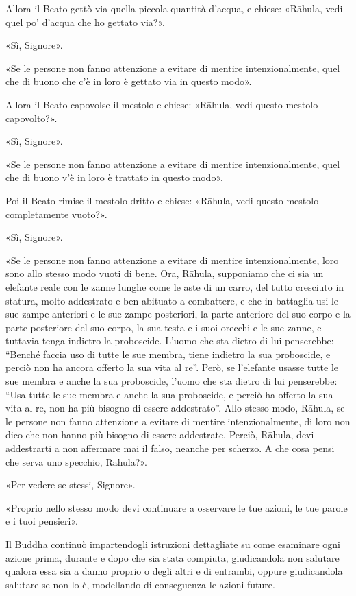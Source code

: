 Allora il Beato gettò via quella piccola quantità d’acqua, e chiese: «Rāhula,
vedi quel po’ d’acqua che ho gettato via?».

«Sì, Signore».

«Se le persone non fanno attenzione a evitare di mentire intenzionalmente, quel
che di buono che c’è in loro è gettato via in questo modo».

Allora il Beato capovolse il mestolo e chiese: «Rāhula, vedi questo mestolo
capovolto?».

«Sì, Signore».

«Se le persone non fanno attenzione a evitare di mentire intenzionalmente, quel
che di buono v’è in loro è trattato in questo modo».

Poi il Beato rimise il mestolo dritto e chiese: «Rāhula, vedi questo mestolo
completamente vuoto?».

«Sì, Signore».

«Se le persone non fanno attenzione a evitare di mentire intenzionalmente, loro
sono allo stesso modo vuoti di bene. Ora, Rāhula, supponiamo che ci sia un
elefante reale con le zanne lunghe come le aste di un carro, del tutto cresciuto
in statura, molto addestrato e ben abituato a combattere, e che in battaglia usi
le sue zampe anteriori e le sue zampe posteriori, la parte anteriore del suo
corpo e la parte posteriore del suo corpo, la sua testa e i suoi orecchi e le
sue zanne, e tuttavia tenga indietro la proboscide. L’uomo che sta dietro di lui
penserebbe: “Benché faccia uso di tutte le sue membra, tiene indietro la sua
proboscide, e perciò non ha ancora offerto la sua vita al re”. Però, se
l’elefante usasse tutte le sue membra e anche la sua proboscide, l’uomo che sta
dietro di lui penserebbe: “Usa tutte le sue membra e anche la sua proboscide, e
perciò ha offerto la sua vita al re, non ha più bisogno di essere addestrato”.
Allo stesso modo, Rāhula, se le persone non fanno attenzione a evitare di
mentire intenzionalmente, di loro non dico che non hanno più bisogno di essere
addestrate. Perciò, Rāhula, devi addestrarti a non affermare mai il falso,
neanche per scherzo. A che cosa pensi che serva uno specchio, Rāhula?».

«Per vedere se stessi, Signore».

«Proprio nello stesso modo devi continuare a osservare le tue azioni, le tue
parole e i tuoi pensieri».


 Il Buddha continuò impartendogli istruzioni
dettagliate su come esaminare ogni azione prima, durante e dopo che sia stata
compiuta, giudicandola non salutare qualora essa sia a danno proprio o degli
altri e di entrambi, oppure giudicandola salutare se non lo è, modellando di
conseguenza le azioni future.

